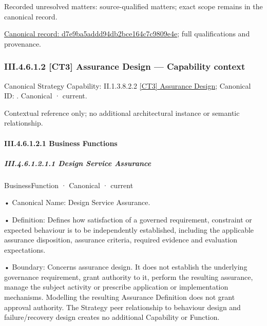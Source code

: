 {\small Recorded unresolved matters: source-qualified matters; exact scope remains in the canonical record.}\par
{\footnotesize \href{../../../../../../../continuum/business/business-function/d7e9ba5addd94db2bce164c7c9809e4e.md}{Canonical record: d7e9ba5addd94db2bce164c7c9809e4e}; full qualifications and provenance.}\par
\subsubsection*{III.4.6.1.2 [CT3] Assurance Design — Capability context}
\label{navigation:III.4.6.1.2}

{\small Canonical Strategy Capability: II.1.3.8.2.2 \hyperref[element:71c8a612b88f4ecba049e94d506bd0c2]{[CT3] Assurance Design}; Canonical ID: \texttt{}. Canonical · current.}\par
Contextual reference only; no additional architectural instance or semantic relationship.\par
\paragraph*{III.4.6.1.2.1 Business Functions}
\label{navigation:III.4.6.1.2.1}

\subparagraph*{III.4.6.1.2.1.1 Design Service Assurance}
\label{navigation:III.4.6.1.2.1.1}

\label{element:6668aa8daf964fec93fce42d48b37ad1}
{\small BusinessFunction · Canonical · current}\par

•
Canonical Name: Design Service Assurance.



•
Definition: Defines how satisfaction of a governed requirement, constraint or expected behaviour is to be independently established, including the applicable assurance disposition, assurance criteria, required evidence and evaluation expectations.



•
Boundary: Concerns assurance design. It does not establish the underlying governance requirement, grant authority to it, perform the resulting assurance, manage the subject activity or prescribe application or implementation mechanisms. Modelling the resulting Assurance Definition does not grant approval authority. The Strategy peer relationship to behaviour design and failure/recovery design creates no additional Capability or Function.



